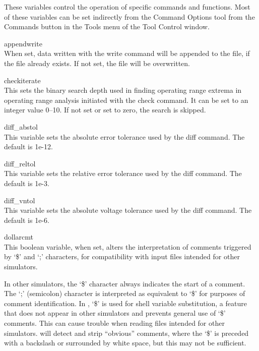 
These variables control the operation of specific {\WRspice} commands
and functions.  Most of these variables can be set indirectly from the
{\cb Command Options} tool from the {\cb Commands} button in the {\cb
Tools} menu of the {\cb Tool Control} window.

\begin{description}
\item{\et appendwrite}\\
When set, data written with the {\cb write} command will be appended
to the file, if the file already exists.  If not set, the
file will be overwritten.

\item{\et checkiterate}\\
This sets the binary search depth used in finding operating range
extrema in operating range analysis initiated with the {\cb check}
command.  It can be set to an integer value 0--10.  If not set or set
to zero, the search is skipped.

\item{\et diff\_abstol}\\
This variable sets the absolute error tolerance used by the {\cb diff}
command.  The default is 1e-12.

\item{\et diff\_reltol}\\
This variable sets the relative error tolerance used by the {\cb diff}
command.  The default is 1e-3.

\item{\et diff\_vntol}\\
This variable sets the absolute voltage tolerance used by the {\cb
diff} command.  The default is 1e-6.

\item{\et dollarcmt}\\
This boolean variable, when set, alters the interpretation of comments
triggered by `{\vt \$}' and `{\vt ;}' characters, for compatibility
with input files intended for other simulators.

In other simulators, the `{\vt \$}' character always indicates the
start of a comment.  The `{\vt ;}' (semicolon) character is
interpreted as equivalent to `{\vt \$}' for purposes of comment
identification.  In {\WRspice}, `{\vt \$}' is used for shell variable
substitution, a feature that does not appear in other simulators and
prevents general use of `{\vt \$}' comments.  This can cause trouble
when reading files intended for other simulators.  {\WRspice} will
detect and strip ``obvious'' comments, where the `{\vt \$}' is
preceded with a backslash or surrounded by white space, but this may
not be sufficient.


\end{description}
